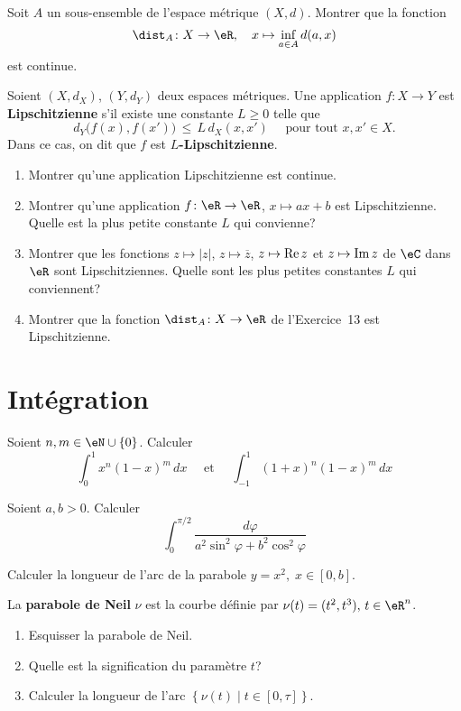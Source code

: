 \exerNico  Soit $A$ un sous-ensemble de l'espace métrique $(X,d)$.
Montrer que la fonction
$$
\dist_A \colon X \to \eR,
\quad x \mapsto \inf_{a \in A} d(a,x)
$$
est continue.


\exerNico  Soient $(X,d_X)$, $(Y,d_Y)$ deux espaces métriques.
Une application $f \colon X \to Y$ est {\bf Lipschitzienne}
s'il existe une constante $L \ge 0$ telle que
$$
d_Y \bigl( f(x), f(x') \bigr) \,\le\, L \,d_X (x,x')
\quad \text{ pour tout } x,x' \in X.
$$
Dans ce cas, on dit que $f$ est {\bf $L$-Lipschitzienne}.


\begin{enumerate}
\item
Montrer qu'une application Lipschitzienne est continue.
\item Montrer qu'une application $f \colon \eR \to \eR$, $x \mapsto ax+b$
est Lipschitzienne.
Quelle est la plus petite constante $L$ qui convienne?

\item Montrer que les fonctions $z \mapsto |z|$,
$z \mapsto \overline z$,
$z \mapsto {\rm Re\,} z$ et $z \mapsto {\rm Im\,} z$
de $\eC$ dans $\eR$ sont Lipschitziennes.
Quelle sont les plus petites constantes $L$ qui conviennent?
\item Montrer que la fonction $\dist_A \colon X \to \eR$ de l'Exercice~13 est Lipschitzienne.

\end{enumerate}





\section{Intégration}

\exerNico
Soient $n,m \in \eN \cup \{0\}$.
Calculer
$$
\int_0^1 x^n (1-x)^m \,dx
\quad \text{ et } \quad
\int_{-1}^1 (1+x)^n (1-x)^m \,dx
$$



\exerNico
Soient $a,b >0$.
Calculer
$$
\int_0^{\pi /2} \displaystyle \frac{d \varphi}{a^2 \sin^2 \varphi + b^2 \cos^2 \varphi}
$$


\exerNico
Calculer la longueur de l'arc de la parabole $y = x^2,\;x \in [0,b]$.

\exerNico
La {\bf parabole de Neil} $\nu$ est la courbe définie par
$\nu (t) = (t^2,t^3), \, t \in \eR^n$.
\begin{enumerate}
\item Esquisser la parabole de Neil.

\item Quelle est la signification du paramètre $t$?

\item Calculer la longueur de l'arc
$\left\{ \nu (t) \mid t \in [0,\tau] \right\}$.
\end{enumerate}

